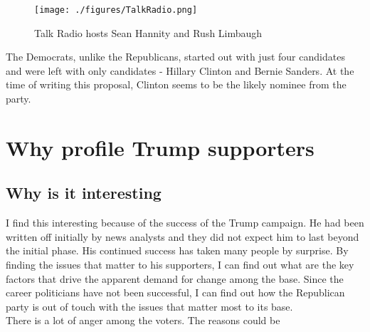 \documentclass{sig-alternate-05-2015}
\begin{document}
\begin{figure}[!t]
\centering
\texttt{[image: ./figures/TalkRadio.png]}
\caption{Talk Radio hosts Sean Hannity and Rush Limbaugh}
\label{TalkRadio}
\end{figure}

The Democrats, unlike the Republicans, started out with just four candidates and were left with only candidates - Hillary Clinton and Bernie Sanders. At the time of writing this proposal, Clinton seems to be the likely nominee from the party.


\section{Why profile Trump supporters}

\subsection{Why is it interesting}
I find this interesting because of the success of the Trump campaign. He had been written off initially by news analysts and they did not expect him to last beyond the initial phase. His continued success has taken many people by surprise. By finding the issues that matter to his supporters, I can find out what are the key factors that drive the apparent demand for change among the base. Since the career politicians have not been successful, I can find out how the Republican party is out of touch with the issues that matter most to its base. \\

There is a lot of anger among the voters. The reasons could be 
\end{document}
